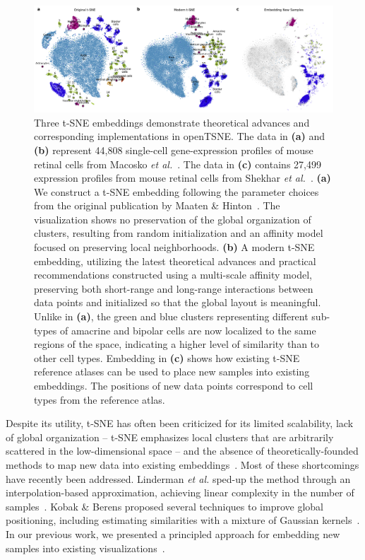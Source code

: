 \documentclass[twocolumn]{bmcart}
\newcommand{\opentsne}{\textsf{openTSNE}}
\begin{document}
\begin{figure}[htbp]
  \includegraphics[width=\textwidth]{macosko2015}
\caption{\label{fig:macosko}
Three t-SNE embeddings demonstrate theoretical advances and corresponding implementations in
\opentsne. The data in \textbf{(a)} and \textbf{(b)} represent 44,808
single-cell gene-expression profiles of mouse retinal cells from Macosko \textit{et al.}~\cite{macosko2015highly}. The data in \textbf{(c)} contains 27,499 expression profiles from mouse
retinal cells from Shekhar \textit{et
al.}~\cite{shekhar2016comprehensive}. \textbf{(a)} We construct a t-SNE
embedding following the parameter choices from the original publication
by Maaten \& Hinton~\cite{maaten2008visualizing}. The visualization
shows no preservation of the global organization of clusters,
resulting from random initialization and an affinity model focused on
preserving local neighborhoods. \textbf{(b)} A modern t-SNE
embedding, utilizing the latest theoretical advances and practical
recommendations constructed using a multi-scale
affinity model, preserving both short-range and long-range interactions
between data points and initialized so that the global layout is
meaningful. Unlike in \textbf{(a)}, the green and blue clusters
representing different sub-types of amacrine and bipolar cells are now
localized to the same regions of the space, indicating a higher level
of similarity than to other cell types. Embedding in \textbf{(c)} shows how existing
t-SNE reference atlases can be used to place new samples into existing
embeddings. The positions of new data points correspond to cell types
from the reference atlas.
}
\end{figure}

Despite its utility, t-SNE has often been criticized for its limited scalability, lack of global organization -- t-SNE emphasizes
local clusters that are arbitrarily scattered in the low-dimensional space --
and the absence of theoretically-founded methods to map new data into
existing embeddings~\cite{ding2018interpretable,becht2019dimensionality}. Most
of these shortcomings have recently been addressed. Linderman \textit{et al.}
sped-up the method through an interpolation-based approximation, achieving linear complexity in the number of
samples~\cite{linderman2019fast}. Kobak \& Berens proposed several techniques
to improve global positioning, including estimating similarities with a mixture
of Gaussian kernels~\cite{kobak2019art}. In our previous work, we presented a principled approach for embedding new samples into existing
visualizations~\cite{policar2019embedding}.
\end{document}
